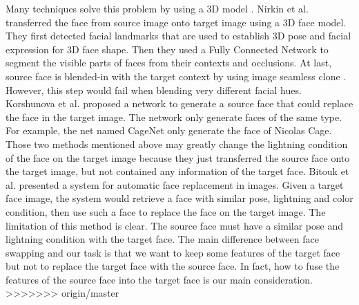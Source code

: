 Many techniques solve this problem by using a 3D model \cite{de3,3d1,onseg}. Nirkin et al. \cite{onseg} transferred the face from source image onto target image using a 3D face model. They first detected facial landmarks that are used to establish 3D pose and facial expression for 3D face shape. Then they used a Fully Connected Network to segment the visible parts of faces from their contexts and occlusions. At last, source face is blended-in with the target context by using image seamless clone \cite{pie}. However, this step would fail when blending very different facial hues. Korshunova et al. \cite{faceswapping} proposed a network to generate a source face that could replace the face in the target image. The network only generate faces of the same type. For example, the net named CageNet only generate the face of Nicolas Cage. Those two methods mentioned above may greatly change the lightning condition of the face on the target image because they just transferred the source face onto the target image, but not contained any information of the target face. Bitouk et al. \cite{autorep} presented a system for automatic face replacement in images. Given a target face image, the system would retrieve a face with similar pose, lightning and color condition, then use such a face to replace the face on the target image. The limitation of this method is clear. The source face must have a similar pose and lightning condition with the target face. 
%
The main difference between face swapping and our task is that we want to keep some features of the target face but not to replace the target face with the source face. In fact, how to fuse the features of the source face into the target face is our main consideration. 
>>>>>>> origin/master
